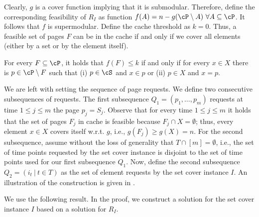  Clearly, $g$ is a cover function implying that it is submodular. Therefore, define the corresponding feasibility of $R_I$ as function $f(A) = n-g(\cP \setminus A)~\forall A \subseteq \cP$. It follows that $f$ is supermodular. Define the cache threshold as $k = 0$. Thus, a feasible set of pages $F$ can be in the cache if and only if we cover all elements (either by a set or by the element itself). 



\begin{obs}
	\label{obs:F}
	For every $F \subseteq \cP$, it holds that $f(F) \leq k$ if and only if for every $x \in X$ there is $p \in \cP \setminus F$ such that (i) $p \in \cS$ and $x \in p$ or (ii) $p \in X$ and $x = p$. 
\end{obs}


We are left with setting the sequence of page requests. We define two consecutive subsequences of requests. The first subsequence $Q_1 = (p_1,\ldots, p_m)$ requests at time $1 \leq j \leq m$ the page $p_j = S_j$. Observe that for every time $1 \leq j \leq m$ it holds that the set of pages $F_j$ in cache is feasible because $F_j \cap X = \emptyset$; thus, every element $x \in X$ covers itself w.r.t. $g$, i.e., $g(F_j) \geq g(X) = n$. 
For the second subsequence, assume without the loss of generality that $T \cap [m] = \emptyset$, i.e., the set of time points requested by the set cover instance is disjoint to the set of time points used for our first subsequence $Q_1$. Now, define the second subsequence $Q_2 = \left(i_t  ~|~ t \in T\right)$ as the set of element requests by the set cover instance $I$. %
An illustration of the construction is given in . 


We use the following result. In the proof, we construct a solution for the set cover instance $I$ based on a solution for $R_I$.


